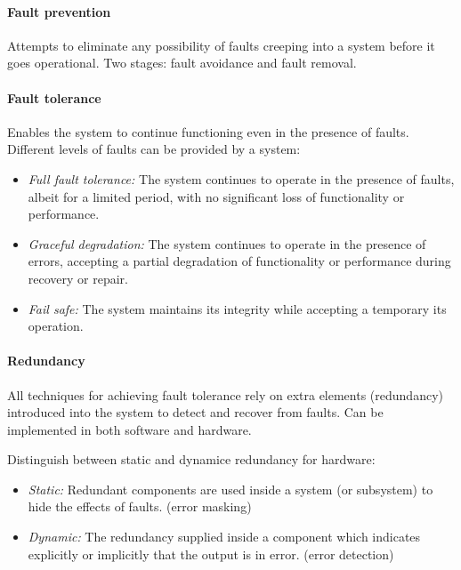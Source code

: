 
\paragraph{Fault prevention} Attempts to eliminate any possibility of faults creeping into a system before it goes operational. Two stages: fault avoidance and fault removal.

\paragraph{Fault tolerance} Enables the system to continue functioning even in the presence of faults. Different levels of faults can be provided by a system:
\begin{itemize}[nolistsep,noitemsep]
  \item \textit{Full fault tolerance:} The system continues to operate in the presence of faults, albeit for a limited period, with no significant loss of functionality or performance.
  \item \textit{Graceful degradation:} The system continues to operate in the presence of errors, accepting a partial degradation of functionality or performance during recovery or repair.
  \item \textit{Fail safe:} The system maintains its integrity while accepting a temporary its operation.
\end{itemize}

\paragraph{Redundancy} All techniques for achieving fault tolerance rely on extra elements (redundancy) introduced into the system to detect and recover from faults. Can be implemented in both software and hardware.

Distinguish between static and dynamice redundancy for hardware:
\begin{itemize}[nolistsep,noitemsep]
  \item \textit{Static:} Redundant components are used inside a system (or subsystem) to hide the effects of faults. (error masking)
  \item \textit{Dynamic:} The redundancy supplied inside a component which indicates explicitly or implicitly that the output is in error. (error detection)
\end{itemize}


